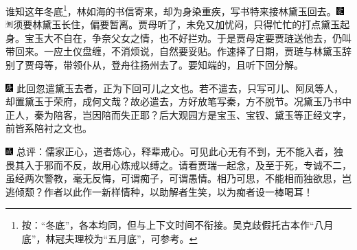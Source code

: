 谁知这年冬底\footnote{按：“冬底”，各本均同，但与上下文时间不衔接。吴克歧假托古本作“八月底”，林冠夫理校为“五月底”，可参考。}，林如海的书信寄来，却为身染重疾，写书特来接林黛玉回去。{\includegraphics[width=3mm]{../Images/00006}\includegraphics[width=3mm]{../Images/00011}\footnotesize \kaishu 须要林黛玉长住，偏要暂离。}贾母听了，未免又加忧闷，只得忙忙的打点黛玉起身。宝玉大不自在，争奈父女之情，也不好拦劝。于是贾母定要贾琏送他去，仍叫带回来。一应土仪盘缠，不消烦说，自然要妥贴。作速择了日期，贾琏与林黛玉辞别了贾母等，带领仆从，登舟往扬州去了。要知端的，且听下回分解。

{{\includegraphics[width=3mm]{../Images/00004}  \kaishu 此回忽遣黛玉去者，正为下回可儿之文也。若不遣去，只写可儿、阿凤等人，却置黛玉于荣府，成何文哉？故必遣去，方好放笔写秦，方不脱节。况黛玉乃书中正人，秦为陪客，岂因陪而失正耶？后大观园方是宝玉、宝钗、黛玉等正经文字，前皆系陪衬之文也。}}

{\includegraphics[width=3mm]{../Images/00005}  \kaishu  总评：儒家正心，道者炼心，释辈戒心。可见此心无有不到，无不能入者，独畏其入于邪而不反，故用心炼戒以缚之。请看贾瑞一起念，及至于死，专诚不二，虽经两次警教，毫无反悔，可谓痴子，可谓愚情。相乃可思，不能相而独欲思，岂逃倾颓？作者以此作一新样情种，以助解者生笑，以为痴者设一棒喝耳！}
